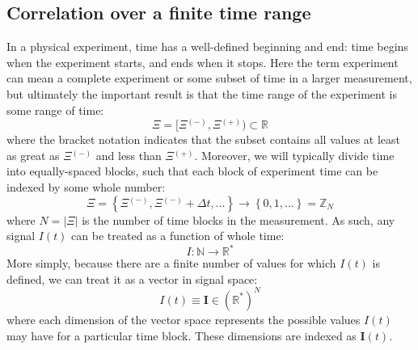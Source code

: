 \documentclass{article}
\newcommand{\braces}[1]{\ensuremath{\left\lbrace #1 \right\rbrace}}
\newcommand{\integers}{\ensuremath{\mathbb{Z}}}
\newcommand{\wholes}{\ensuremath{\mathbb{N}}}
\newcommand{\reals}{\ensuremath{\mathbb{R}}}
\renewcommand{\vec}{\boldsymbol}
\newcommand{\abs}[1]{\ensuremath{\left|#1\right|}}
\newcommand{\integrationtime}{\ensuremath{\Xi}}
\newcommand{\tstart}{\integrationtime\upminus}
\newcommand{\tstop}{\integrationtime\upplus}
\newcommand{\upplus}{\ensuremath{^{(+)}}}
\newcommand{\upminus}{\ensuremath{^{(-)}}}
\begin{document}
\subsection{Correlation over a finite time range}
In a physical experiment, time has a well-defined beginning and end: time begins when the experiment starts, and ends when it stops. Here the term experiment can mean a complete experiment or some subset of time in a larger measurement, but ultimately the important result is that the time range of the experiment is some range of time:
\begin{equation}
\integrationtime = [\tstart,\tstop)\subset\reals
\end{equation}
where the bracket notation indicates that the subset contains all values at least as great as $\tstart$ and less than $\tstop$. Moreover, we will typically divide time into equally-spaced blocks, such that each block of experiment time can be indexed by some whole number:
\begin{equation}
\integrationtime = \braces{\tstart,\tstart+\Delta t,\ldots} 
       \rightarrow \braces{0,1,\ldots} = \integers_{N}
\end{equation}
where $N=\abs{\integrationtime}$ is the number of time blocks in the measurement. As such, any signal $I(t)$ can be treated as a function of whole time:
\begin{equation}
I:\wholes\rightarrow\reals^{*}
\end{equation}
More simply, because there are a finite number of values for which $I(t)$ is defined, we can treat it as a vector in signal space:
\begin{equation}
I(t) \equiv \vec{I}\in \left(\reals^{*}\right)^{N}
\end{equation}
where each dimension of the vector space represents the possible values $I(t)$ may have for a particular time block. These dimensions are indexed as $\vec{I}(t)$.
\end{document}
